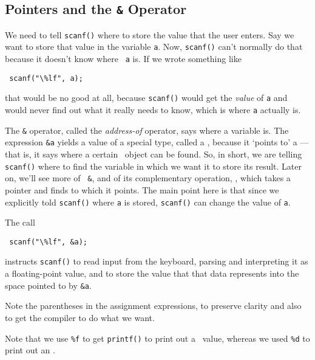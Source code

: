 \subsection {Pointers and the {\tt\&} Operator}
\label{first-pointers}

We need to tell {\tt scanf()} where to store the value that the user
enters.  Say we want to store that value in the variable {\tt a}.  Now,
{\tt scanf()} can't normally do that because it doesn't know where {\tt
a} is.  If we wrote something like

\verb+ scanf("\%lf", a); +

\noindent that would be no good at all, because {\tt scanf()} would get
the {\em value}\/ of {\tt a} and would never find out what it really
needs to know, which is where {\tt a} actually is.

The {\tt \&} operator, called the {\em address-of}\/ operator, says
where a variable is.  The expression {\tt \&a} yields a value of a
special type, called a \Double, because it `points to' a
\double---that is, it says where a certain \double\ object can be found.
So, in short, we are telling {\tt scanf()} where to find the variable in
which we want it to store its result.  Later on, we'll see more of {\tt
\&}, and of its complementary operation, {\tt *}, which takes a pointer and
finds to which it points.  The main point here is that since we
explicitly told {\tt scanf()} where {\tt a} is stored, {\tt scanf()} can
change the value of {\tt a}.


The call 

\verb+ scanf("\%lf", &a); +

\noindent instructs {\tt scanf()} to read input from the keyboard,
parsing and interpreting it as a floating-point value, and to store the
value that that data represents into the space pointed to by {\tt \&a}.

Note the parentheses in the assignment expressions, to preserve clarity
and also to get the compiler to do what we want.

Note that we use {\tt \%f} to get {\tt printf()} to print out a \double\
value, whereas we used {\tt \%d} to print out an \int.

